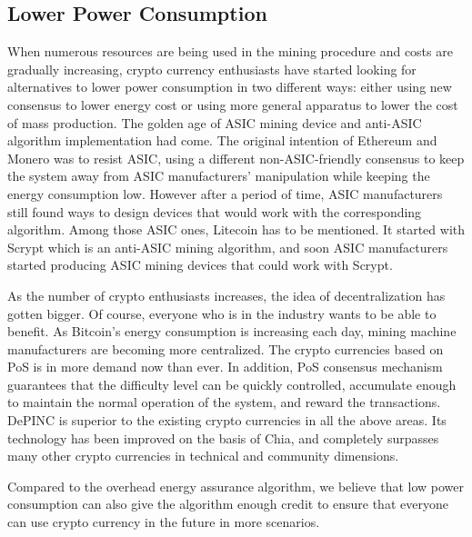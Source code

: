 \subsection{Lower Power Consumption}
\begin{flushleft}
    When numerous resources are being used in the mining procedure and costs are gradually increasing, crypto currency enthusiasts have started looking for alternatives to lower power consumption in two different ways: either using new consensus to lower energy cost or using more general apparatus to lower the cost of mass production. The golden age of ASIC mining device and anti-ASIC algorithm implementation had come. The original intention of Ethereum and Monero was to resist ASIC, using a different non-ASIC-friendly consensus to keep the system away from ASIC manufacturers’ manipulation while keeping the energy consumption low. However after a period of time, ASIC manufacturers still found ways to design devices that would work with the corresponding algorithm. Among those ASIC ones, Litecoin has to be mentioned. It started with Scrypt which is an anti-ASIC mining algorithm, and soon ASIC manufacturers started producing ASIC mining devices that could work with Scrypt.
\end{flushleft}
\begin{flushleft}
    As the number of crypto enthusiasts increases, the idea of decentralization has gotten bigger. Of course, everyone who is in the industry wants to be able to benefit. As Bitcoin's energy consumption is increasing each day, mining machine manufacturers are becoming more centralized. The crypto currencies based on PoS is in more demand now than ever. In addition, PoS consensus mechanism guarantees that the difficulty level can be quickly controlled, accumulate enough to maintain the normal operation of the system, and reward the transactions. DePINC is superior to the existing crypto currencies in all the above areas. Its technology has been improved on the basis of Chia, and completely surpasses many other crypto currencies in technical and community dimensions.
\end{flushleft}
\begin{flushleft}
    Compared to the overhead energy assurance algorithm, we believe that low power consumption can also give the algorithm enough credit to ensure that everyone can use crypto currency in the future in more scenarios.
\end{flushleft}
